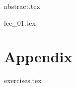 \documentclass[a4paper, english, fancyfoot, git, dvipsnames]{mkessler-script}
\author{Maximilian Keßler}
\begin{document}
    \maketitle

    {abstract.tex}

    \cleardoublepage
    \tableofcontents

    \cleardoublepage
    \summaryoflectures

    \cleardoublepage
    {lec_01.tex}

    \cleardoublepage
    \appendix
    \part{Appendix}

    {exercises.tex}
    

    \cleardoublepage
    \printvocabindex


    \cleardoublepage
    \printliterature
\end{document}

